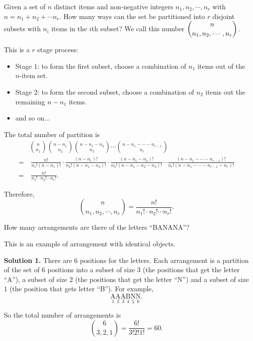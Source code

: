   Given a set of $n$ distinct items and non-negative integers $n_1, n_2,\cdots,
  n_r$ with $n=n_1+n_2+\cdots n_r$. How many ways can the set be partitioned
  into $r$ disjoint subsets with $n_i$ items in the $i$th subset? We call this
  number $\displaystyle \binom{n}{n_1,n_2,\cdots,n_r}$.

  This is a $r$ stage process:
  \begin{itemize}
  \item Stage $1$: to form the first subset, choose a combination of $n_1$ items
    out of the $n$-item set.
  \item Stage $2$: to form the second subset, choose a combination of $n_2$
    items out the remaining $n-n_1$ items.
  \item and so on...
  \end{itemize}

  The total number of partition is
  \begin{align*}
    &\binom{n}{n_1}\binom{n-n_1}{n_2}\binom{n-n_1-n_2}{n_3}\cdots\binom{n-n_1-\cdots
    - n_{r-1}}{n_r} \\
    =&\ \frac{n!}{n_1!(n-n_1)!}\cdot \frac{(n-n_1)!}{n_2!(n-n_1-n_2)!}\cdot \frac{(n-n_1-n_2)!}{n_3!(n-n_1-n_2-n_3)!}\cdots \frac{(n-n_1-\cdots -n_{r-1})!}{n_r!(n-n_1-\cdots - n_{r-1}-n_r)!}\\
    =&\ \frac{n!}{n_1!\cdot n_2!\cdots n_r!}.
  \end{align*}

  Therefore,
  \[
    \binom{n}{n_1,n_2,\cdots, n_r} = \frac{n!}{n_1!\cdot n_2!\cdots n_r!}.
  \]

  \begin{example}
    How many arrangements are there of the letters ``BANANA''? 
  \end{example}

  This is an example of arrangement with identical objects.

  \textbf{Solution 1.} There are $6$ positions for the letters. Each arrangement
  is a partition of the set of $6$ positions into a subset of size $3$ (the
  positions that get the letter ``A''), a subset of size $2$ (the positions that
  get the letter ``N'') and a subset of size $1$ (the position that gets letter
  ``B''). For example,
  \[
    \underset{1}{\text{A}}\underset{2}{\text{A}}\underset{3}{\text{A}}\underset{4}{\text{B}}
    \underset{5}{\text{N}} \underset{6}{\text{N}}.
  \]
  
  So the total number of arrangements is
  \[
    \binom{6}{3,2,1} = \frac{6!}{3!2!1!} = 60.
  \]

